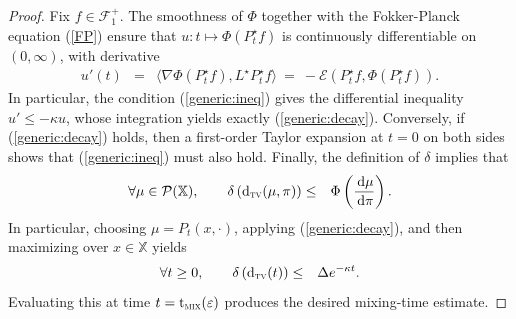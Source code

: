 \documentclass[12pt,final]{article}
\numberwithin{equation}{section}
\newcommand{\dd}{\,\mathrm{d}}
\newcommand{\cE}{\mathscr {E}}
\newcommand{\cF}{\mathcal {F}}
\newcommand{\dX}{\mathbb{X}}
\newcommand{\cP}{\mathcal{P}}
\newcommand{\dtv}{{\rm d}_{\textsc{tv}}}
\newcommand{\tmix}{{\rm t}_{\textsc{mix}}}
\begin{document}
\begin{proof}Fix $f\in\cF_1^+$. The smoothness of $\Phi$ together with the Fokker-Planck equation (\ref{FP}) ensure that  $u\colon t\mapsto \Phi(P_t^\star f)$ is continuously differentiable on $(0,\infty)$, with derivative
\begin{eqnarray*}
u'(t) & = & \langle \nabla\Phi(P_t^\star f),L^\star P_t^\star f\rangle \ = \ -\cE(P_t^\star f,\Phi(P_t^\star f)).
\end{eqnarray*}
In particular, the condition (\ref{generic:ineq}) gives the differential inequality $u'\le -\kappa u$, whose integration yields exactly (\ref{generic:decay}). Conversely, if  (\ref{generic:decay}) holds, then a first-order Taylor expansion at $t=0$ on both sides shows that (\ref{generic:ineq}) must also hold. Finally, the definition of $\delta$ implies that
\begin{eqnarray*}
\forall \mu\in\cP(\dX),\qquad \delta\left(\dtv(\mu,\pi)\right) & \le & \Phi\left(\frac{\dd \mu}{\dd \pi}\right).
\end{eqnarray*}
In particular, choosing $\mu=P_t(x,\cdot)$, applying 
 (\ref{generic:decay}), and then maximizing over $x\in\dX$ yields
 \begin{eqnarray*}
\forall t\ge 0,\qquad \delta\left(\dtv(t)\right) & \le & \Delta e^{-\kappa t}.
\end{eqnarray*}
Evaluating this at time $t=\tmix(\varepsilon)$ produces the desired mixing-time estimate.
\end{proof}
\end{document}
